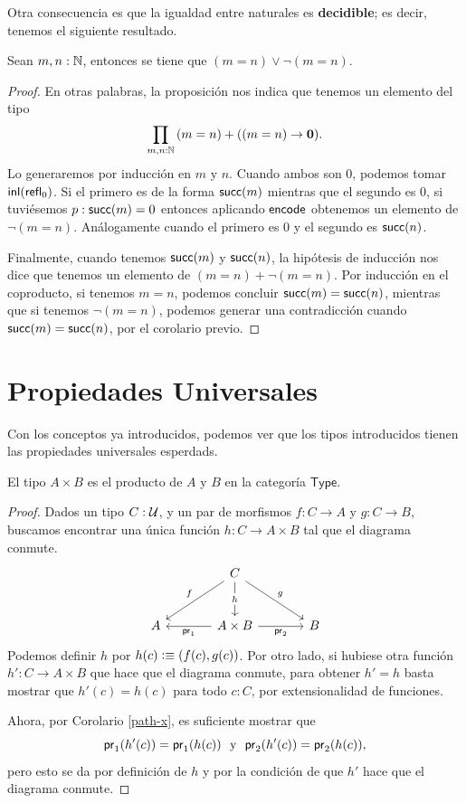 \documentclass[../main.tex]{subfiles}
\begin{document}
Otra consecuencia es que la igualdad entre naturales es \textbf{decidible}; es decir, tenemos el siguiente resultado.

\begin{corollary}
  Sean $m,n: \mathbb{N}$, entonces se tiene que $(m=n) \vee \lnot (m=n)$.
\end{corollary}
\begin{proof}
  En otras palabras, la proposici\'on nos indica que tenemos un elemento del tipo
  \[ \prd{m,n:\N} (m = n) + ((m=n) \to \emptyt). \]
  Lo generaremos por inducci\'on en $m$ y $n$.
  Cuando ambos son $0$, podemos tomar ${\mathsf{inl}}(\mathsf{refl}_{0})$.
  Si el primero es de la forma $\mathsf{succ}(m)$ mientras que el segundo es 0, si tuvi\'esemos $p:\mathsf{succ}(m)=0$ entonces aplicando $\mathsf{encode}$ obtenemos un elemento de $\lnot (m=n)$.
  An\'alogamente cuando el primero es $0$ y el segundo es $\mathsf{succ}(n)$.

  Finalmente, cuando tenemos $\mathsf{succ}(m)$ y $\mathsf{succ}(n)$, la hipótesis de inducción nos dice que tenemos un elemento de $(m = n) + \lnot (m=n)$.
  Por inducci\'on en el coproducto, si tenemos $m=n$, podemos concluir $\mathsf{succ}(m)=\mathsf{succ}(n)$, mientras que si tenemos $\lnot(m=n)$, podemos generar una contradicción cuando $\mathsf{succ}(m)=\mathsf{succ}(n)$, por el corolario previo.
\end{proof}

\section{Propiedades Universales}\label{univ-prop-sec}
Con los conceptos ya introducidos, podemos ver que los tipos introducidos tienen las propiedades universales esperdads.

\begin{theorem}
  El tipo $A \times B$ es el producto de $A$ y $B$ en la categor\'ia $\mathsf{Type}$.
\end{theorem}
\begin{proof}
  Dados un tipo $C:\mathcal{U}$, y un par de morfismos $f:C \to A$ y $g:C \to B$, buscamos encontrar una \'unica funci\'on $h:C \to A \times B$ tal que el diagrama conmute.
  \[\begin{tikzcd}[row sep=large,column sep=large]
      & C \\
      A & {A \times B} & B
      \arrow["f"', from=1-2, to=2-1]
      \arrow["{\fst}", from=2-2, to=2-1]
      \arrow["g", from=1-2, to=2-3]
      \arrow["{\snd}"', from=2-2, to=2-3]
      \arrow["h"{description}, from=1-2, to=2-2]
    \end{tikzcd}\]
  Podemos definir $h$ por $h(c)\vcentcolon\equiv(f(c),g(c))$. Por otro lado, si hubiese otra funci\'on $h':C \to A\times B$ que hace que el diagrama conmute, para obtener $h'=h$ basta mostrar que $h'(c) = h(c)$ para todo $c:C$, por extensionalidad de funciones.

  Ahora, por Corolario \ref{path-x}, es suficiente mostrar que
  \[ \mathsf{pr}_{1}(h'(c)) = \mathsf{pr}_{1}(h(c)) \,\, \text{ y } \,\, \mathsf{pr}_{2}(h'(c)) = \mathsf{pr}_{2}(h(c)), \]
  pero esto se da por definici\'on de $h$ y por la condici\'on de que $h'$ hace que el diagrama conmute.
\end{proof}
\end{document}
